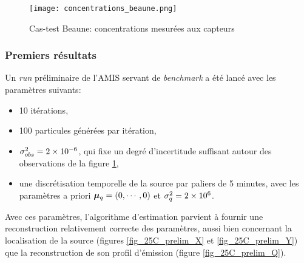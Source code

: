 %




\begin{figure}[h!]
	\centering
	\texttt{[image: concentrations\_beaune.png]}
	\caption{Cas-test Beaune: concentrations mesurées aux capteurs}
	\label{fig_observations_25CAPTEURS}
\end{figure}

\subsubsection{Premiers résultats}

Un \textit{run} préliminaire de l'AMIS servant de \textit{benchmark} a été lancé avec les paramètres suivants:
\begin{itemize}
	\item 10 itérations,
	\item 100 particules générées par itération,
	\item ${\sigma_{obs}^2} = 2\times 10^{-6}$, qui fixe un degré d'incertitude suffisant autour des observations de la figure \ref{fig_observations_25CAPTEURS},
	\item une discrétisation temporelle de la source par paliers de 5 minutes, avec les paramètres a priori ${\bm{\mu}_q} = (0,\cdots,0)$ et $\sigma_q^2 = 2\times 10^6$.
\end{itemize}

Avec ces paramètres, l'algorithme d'estimation parvient à fournir une reconstruction relativement correcte des paramètres, aussi bien concernant la localisation de la source (figures \ref{fig_25C_prelim_X} et \ref{fig_25C_prelim_Y}) que la reconstruction de son profil d'émission (figure \ref{fig_25C_prelim_Q}).\\

